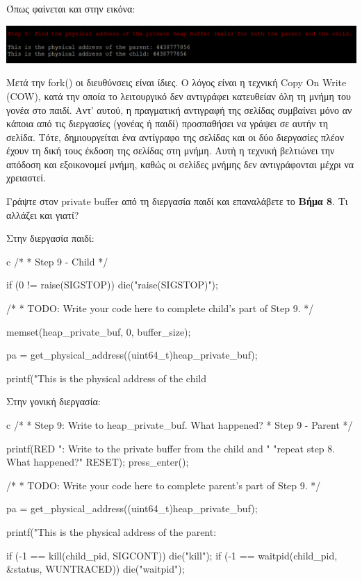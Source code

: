 \documentclass[12pt]{article}
\begin{document}
Όπως φαίνεται και στην εικόνα:

\centerline{\includegraphics[width=1\textwidth]{3_1_8.png}}

Μετά την fork() οι διευθύνσεις είναι ίδιες. Ο λόγος είναι η τεχνική Copy On Write (COW), 
κατά την οποία το λειτουργικό δεν αντιγράφει κατευθείαν όλη τη μνήμη του γονέα στο παιδί. 
Αντ' αυτού, η πραγματική αντιγραφή της σελίδας συμβαίνει μόνο αν κάποια από τις 
διεργασίες (γονέας ή παιδί) προσπαθήσει να γράψει σε αυτήν τη σελίδα. 
Τότε, δημιουργείται ένα αντίγραφο της σελίδας και οι δύο διεργασίες πλέον έχουν 
τη δική τους έκδοση της σελίδας στη μνήμη. 
Αυτή η τεχνική βελτιώνει την απόδοση και εξοικονομεί μνήμη, καθώς οι σελίδες μνήμης 
δεν αντιγράφονται μέχρι να χρειαστεί.

\begin{question}
Γράψτε στον private buffer από τη διεργασία παιδί και επαναλάβετε το \textbf{Βήμα 8}. 
Τι αλλάζει και γιατί?
\end{question}

Στην διεργασία παιδί:

\begin{codeless}{c}
    /*
    * Step 9 - Child
    */
   
   if (0 != raise(SIGSTOP))
   {
       die("raise(SIGSTOP)");
   }
   
   /*
    * TODO: Write your code here to complete child's part of Step 9.
    */
   
   memset(heap_private_buf, 0, buffer_size);
   
   pa = get_physical_address((uint64_t)heap_private_buf);
       
   printf("This is the physical address of the child %
\end{codeless}

Στην γονική διεργασία:

\begin{codeless}{c}
    /*
    * Step 9: Write to heap_private_buf. What happened?
    * Step 9 - Parent
    */
   
   printf(RED ": Write to the private buffer from the child and "
       "repeat step 8. What happened?\n" RESET);
   press_enter();

   /*
    * TODO: Write your code here to complete parent's part of Step 9.
    */
   
   pa = get_physical_address((uint64_t)heap_private_buf);	
   
   printf("This is the physical address of the parent: %

   if (-1 == kill(child_pid, SIGCONT))
   {
       die("kill");
   }
   if (-1 == waitpid(child_pid, &status, WUNTRACED))
   {
       die("waitpid");
   }

\end{codeless}
\end{document}
